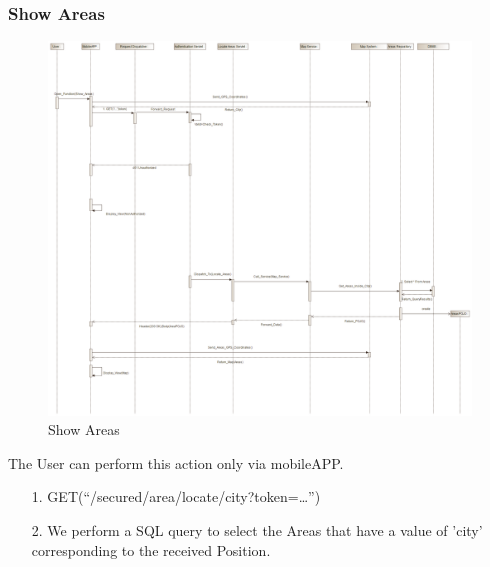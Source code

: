 \documentclass[12pt]{article}
\begin{document}
\subsubsection{Show Areas}
\begin{figure}[h]
	\centering
	\includegraphics[width=\textwidth]{../Images/Sequence_Final/Show_Areas}
	\caption{Show Areas}
\end{figure}
The User can perform this action only via mobileAPP.
\begin{enumerate}
	\item[1.] GET(``/secured/area/locate/{city}?token=…'')
	\item[2.] We perform a SQL query to select the Areas that have a value of 'city' corresponding to the received Position.
\end{enumerate}
\clearpage
\end{document}
